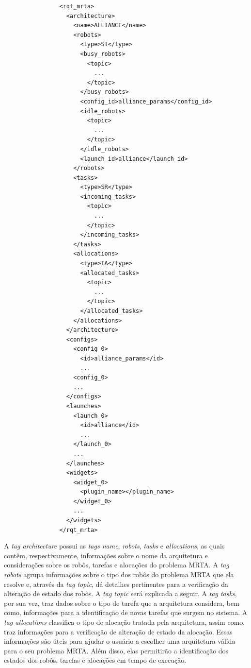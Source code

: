             \begin{lstlisting}
                <rqt_mrta>
                  <architecture>
                    <name>ALLIANCE</name>
                    <robots>
                      <type>ST</type>
                      <busy_robots>
                        <topic>
                          ...
                        </topic>
                      </busy_robots>
                      <config_id>alliance_params</config_id>
                      <idle_robots>
                        <topic>
                          ...
                        </topic>
                      </idle_robots>
                      <launch_id>alliance</launch_id>
                    </robots>
                    <tasks>
                      <type>SR</type>
                      <incoming_tasks>
                        <topic>
                          ...
                        </topic>
                      </incoming_tasks>
                    </tasks>
                    <allocations>
                      <type>IA</type>
                      <allocated_tasks>
                        <topic>
                          ...
                        </topic>
                      </allocated_tasks>
                    </allocations>
                  </architecture>
                  <configs>
                    <config_0>
                      <id>alliance_params</id>
                      ...
                    <config_0>
                    ...
                  </configs>
                  <launches>
                    <launch_0>
                      <id>alliance</id>
                      ...
                    </launch_0>
                    ...
                  </launches>
                  <widgets>
                    <widget_0>
                      <plugin_name></plugin_name>
                    </widget_0>
                    ...
                  </widgets>
                </rqt_mrta>
            \end{lstlisting}
            
            A \textit{tag architecture} possui as \textit{tags name}, \textit{robots}, \textit{tasks} e \textit{allocations}, as quais contêm, respectivamente, informações sobre o nome da arquitetura e considerações sobre os robôs, tarefas e alocações do problema MRTA. A \textit{tag robots} agrupa informações sobre o tipo dos robôs do problema MRTA que ela resolve e, através da \textit{tag topic}, dá detalhes pertinentes para a verificação da alteração de estado dos robôs. A \textit{tag topic} será explicada a seguir. A \textit{tag tasks}, por sua vez, traz dados sobre o tipo de tarefa que a arquitetura considera, bem como, informações para a identificação de novas tarefas que surgem no sistema. A \textit{tag allocations} classifica o tipo de alocação tratada pela arquitetura, assim como, traz informações para a verificação de alteração de estado da alocação. Essas informações são úteis para ajudar o usuário a escolher uma arquitetura válida para o seu problema MRTA. Além disso, elas permitirão a identificação dos estados dos robôs, tarefas e alocações em tempo de execução.
            
